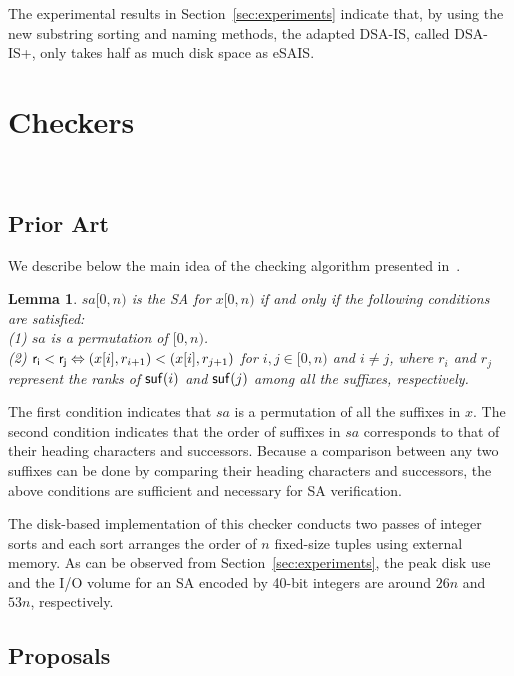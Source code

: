 \documentclass[10pt,journal,compsoc]{IEEEtran}
\newtheorem{lemma}[theorem]{Lemma}
\begin{document}
The experimental results in Section~\ref{sec:experiments} indicate that, by using the new substring sorting and naming methods, the adapted DSA-IS, called DSA-IS+, only takes half as much disk space as eSAIS.

\section{Checkers}~\label{sec:checkers}

\subsection{Prior Art} \label{sec:checkers:prior_art}

We describe below the main idea of the checking algorithm presented in~\cite{Dementiev2008a}.

\begin{lemma} \label{lemma:1}
	$sa[0, n)$ is the SA for $x[0, n)$ if and only if the following conditions are satisfied:\\
	(1) $sa$ is a permutation of $[0, n)$. \\	
	(2) ${\sf r_i < r_j} \Leftrightarrow (x[i], r_{i + 1}) < (x[i], r_{j + 1})$ for $ i, j \in [0, n)$ and $i\ne j$, where $r_i$ and $r_j$ represent the ranks of ${\sf suf}(i)$ and ${\sf suf}(j)$ among all the suffixes, respectively. \\
\end{lemma}

\begin{IEEEproof}The first condition indicates that $sa$ is a permutation of all the suffixes in $x$. The second condition indicates that the order of suffixes in $sa$ corresponds to that of their heading characters and successors. Because a comparison between any two suffixes can be done by comparing their heading characters and successors, the above conditions are sufficient and necessary for SA verification.

\end{IEEEproof}

The disk-based implementation of this checker conducts two passes of integer sorts and each sort arranges the order of $n$ fixed-size tuples using external memory. As can be observed from Section~\ref{sec:experiments}, the peak disk use and the I/O volume for an SA encoded by 40-bit integers are around $26n$ and $53n$, respectively.

\subsection{Proposals} \label{sec:checkers:proposals}
\end{document}
